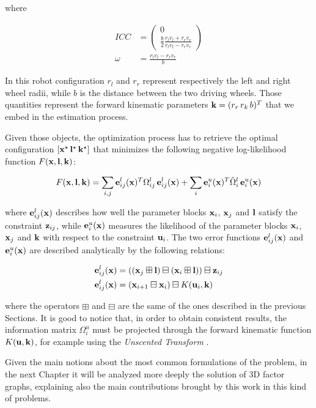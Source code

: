 \noindent where 

\begin{align*}
    ICC &= 
        \begin{pmatrix}
            0 \\ \frac{b}{2} \frac{r_l v_l + r_r v_r}{r_l v_l - r_r v_r}
        \end{pmatrix} \\
    \omega &= \frac{r_l v_l - r_r v_r}{b}
\end{align*}

\noindent In this robot configuration $r_l$ and $r_r$ represent respectively the left and right wheel radii, while $b$ is the distance between the two driving wheels. Those quantities represent the forward kinematic parameters $\mathbf{k} = (r_r\,r_k\,b)^T$ that we embed in the estimation process.

Given those objects, the optimization process has to retrieve the optimal configuration $\left[\mathbf{x}^\star \, \mathbf{l}^\star \, \mathbf{k}^\star\right]$ that minimizes the following negative log-likelihood function $F(\mathbf{x}, \mathbf{l}, \mathbf{k})$:

\begin{equation}
    F(\mathbf{x}, \mathbf{l}, \mathbf{k}) = 
        \sum_{i,j} \mathbf{e}_{ij}^l(\mathbf{x})^T\Omega_{ij}^l\,\mathbf{e}_{ij}^l(\mathbf{x}) + 
        \sum_{i} \mathbf{e}_{i}^u(\mathbf{x})^T\tilde{\Omega}_{i}^l\,\mathbf{e}_{i}^u(\mathbf{x})
\end{equation}

\noindent where $\mathbf{e}_{ij}^l(\mathbf{x})$ describes how well the parameter blocks $\mathbf{x}_i$, $\mathbf{x}_j$ and $\mathbf{l}$ satisfy the constraint $\mathbf{z}_{ij}$, while $\mathbf{e}_{i}^u(\mathbf{x})$ measures the likelihood of the parameter blocks $\mathbf{x}_i$, $\mathbf{x}_j$ and $\mathbf{k}$ with respect to the constraint $\mathbf{u}_i$. The two error functions $\mathbf{e}_{ij}^l(\mathbf{x})$ and $\mathbf{e}_{i}^u(\mathbf{x})$ are described analytically by the following relations:

\begin{align*}
    \mathbf{e}_{ij}^l(\mathbf{x}) &= \left(\left(\mathbf{x}_j \boxplus \mathbf{l}\right) \boxminus \left(\mathbf{x}_i \boxplus \mathbf{l}\right)\right) \boxminus \mathbf{z}_{ij} \\
    \mathbf{e}_{ij}^l(\mathbf{x}) &= \left(\mathbf{x}_{i+1} \boxminus \mathbf{x}_i\right) \boxminus K(\mathbf{u}_i, \mathbf{k})
\end{align*}

\noindent where the operators $\boxplus$ and $\boxminus$ are the same of the ones described in the previous Sections. It is good to notice that, in order to obtain consistent results, the information matrix $\Omega_{i}^u$ must be projected through the forward kinematic function $K(\mathbf{u}, \mathbf{k})$, for example using the \textit{Unscented Transform} \cite{julier2002scaledUT}.

\vspace{15px}

Given the main notions about the most common formulations of the problem, in the next Chapter it will be analyzed more deeply the solution of 3D factor graphs, explaining also the main contributions brought by this work in this kind of problems.